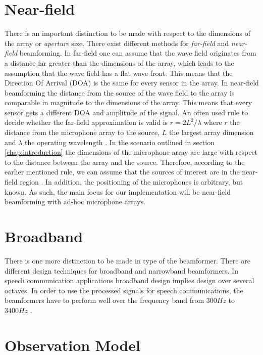 \section{Near-field}
\label{sec:problem_near-field}
There is an important distinction to be made with respect to the dimensions of the array or \textit{aperture} size. There exist different methods for \textit{far-field} and \textit{near-field} beamforming. In far-field one can assume that the wave field originates from a distance far greater than the dimensions of the array, which leads to the assumption that the wave field has a flat wave front. This means that the Direction Of Arrival (DOA) is the same for every sensor in the array. In near-field beamforming the distance from the source of the wave field to the array is comparable in magnitude to the dimensions of the array. This means that every sensor gets a different DOA and amplitude of the signal. \newline
An often used rule to decide whether the far-field approximation is valid is $r = 2L^2/\lambda$ where $r$ the distance from the microphone array to the source, $L$ the largest array dimension and $\lambda$ the operating wavelength \cite{kennedy1998}. In the scenario outlined in section {\ref{chap:introduction}} the dimensions of the microphone array are large with respect to the distance between the array and the source. Therefore, according to the earlier mentioned rule, we can assume that the sources of interest are in the near-field region \cite{gaubitch2014}. In addition, the positioning of the microphones is arbitrary, but known. As such, the main focus for our implementation will be near-field beamforming with ad-hoc microphone arrays. 


\section{Broadband}
\label{sec:problem_broadband}
There is one more distinction to be made in type of the beamformer. There are different design techniques for broadband and narrowband beamformers. In speech communication applications broadband design implies design over several octaves. In order to use the processed signals for speech communications, the beamformers have to perform well over the frequency band from $300 Hz$ to $3400 Hz$ \cite{ituspeechfreq2011}.

\section{Observation Model}
\label{sec:observation}


